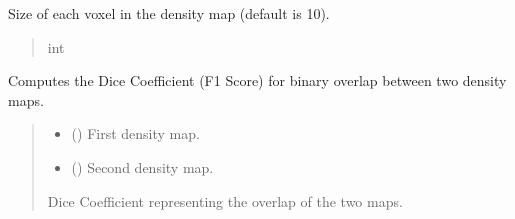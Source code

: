 \documentclass[letterpaper,10pt,english]{sphinxmanual}
\begin{document}
\begin{fulllineitems}

\begin{fulllineitems}
\label{\detokenize{src:src.BagelFitter.BagelFitter.voxel_size}}
\pysigstartsignatures
{}
\pysigstopsignatures
\sphinxAtStartPar
Size of each voxel in the density map (default is 10).
\begin{quote}\begin{description}
\sphinxAtStartPar
int

\end{description}\end{quote}

\end{fulllineitems}


\begin{fulllineitems}
\label{\detokenize{src:src.BagelFitter.BagelFitter.calculate_dice_coefficient}}
\pysigstartsignatures
{}
\pysigstopsignatures
\sphinxAtStartPar
Computes the Dice Coefficient (F1 Score) for binary overlap between two density maps.
\begin{quote}\begin{description}
\begin{itemize}
\item {} 
\sphinxAtStartPar
{} () \textendash{} First density map.

\item {} 
\sphinxAtStartPar
{} () \textendash{} Second density map.

\end{itemize}

\sphinxAtStartPar
Dice Coefficient representing the overlap of the two maps.


\end{description}
\end{quote}
\end{fulllineitems}
\end{fulllineitems}
\end{document}

